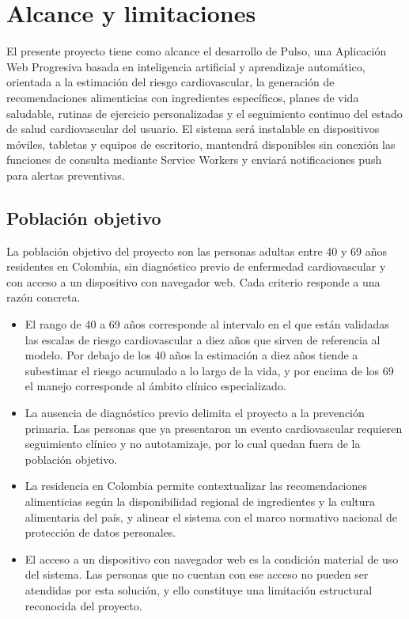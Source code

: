 \documentclass[conference]{IEEEtran}
\begin{document}
\section{Alcance y limitaciones}
El presente proyecto tiene como alcance el desarrollo de Pulso, una Aplicación Web Progresiva basada en inteligencia artificial y aprendizaje automático, orientada a la estimación del riesgo cardiovascular, la generación de recomendaciones alimenticias con ingredientes específicos, planes de vida saludable, rutinas de ejercicio personalizadas y el seguimiento continuo del estado de salud cardiovascular del usuario. El sistema será instalable en dispositivos móviles, tabletas y equipos de escritorio, mantendrá disponibles sin conexión las funciones de consulta mediante Service Workers y enviará notificaciones push para alertas preventivas.

\subsection{Población objetivo}
La población objetivo del proyecto son las personas adultas entre 40 y 69 años residentes en Colombia, sin diagnóstico previo de enfermedad cardiovascular y con acceso a un dispositivo con navegador web. Cada criterio responde a una razón concreta.

\begin{itemize}
\item El rango de 40 a 69 años corresponde al intervalo en el que están validadas las escalas de riesgo cardiovascular a diez años que sirven de referencia al modelo. Por debajo de los 40 años la estimación a diez años tiende a subestimar el riesgo acumulado a lo largo de la vida, y por encima de los 69 el manejo corresponde al ámbito clínico especializado.
\item La ausencia de diagnóstico previo delimita el proyecto a la prevención primaria. Las personas que ya presentaron un evento cardiovascular requieren seguimiento clínico y no autotamizaje, por lo cual quedan fuera de la población objetivo.
\item La residencia en Colombia permite contextualizar las recomendaciones alimenticias según la disponibilidad regional de ingredientes y la cultura alimentaria del país, y alinear el sistema con el marco normativo nacional de protección de datos personales.
\item El acceso a un dispositivo con navegador web es la condición material de uso del sistema. Las personas que no cuentan con ese acceso no pueden ser atendidas por esta solución, y ello constituye una limitación estructural reconocida del proyecto.
\end{itemize}
\end{document}
